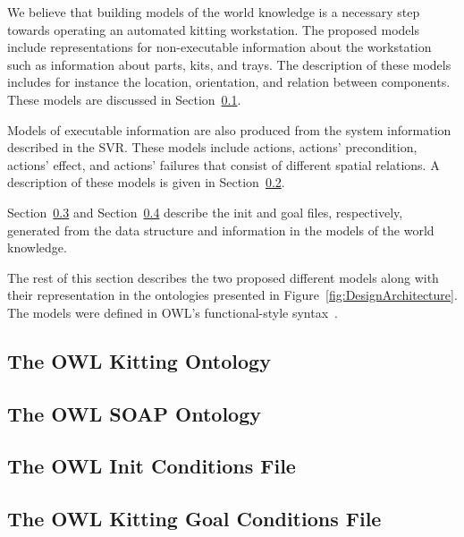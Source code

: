 We believe that building models of the world knowledge is a necessary step towards operating an automated kitting workstation. The proposed models include representations for non-executable information about the workstation such as information about parts, kits, and trays. The description of these models includes for instance the location, orientation, and relation between components. These models are discussed in Section~\ref{owlkitting}.

Models of executable information are also produced from the system information described in the SVR. These models include actions, actions' precondition, actions' effect, and actions' failures that consist of different spatial relations. A description of these models is given in Section~\ref{owlsoap}.

Section~\ref{owlinit} and Section~\ref{owlgoal} describe the init and goal files, respectively, generated from the data structure and information in the models of the world knowledge.

The rest of this section describes the two proposed different models along with their representation in the ontologies presented in Figure~\ref{fig:DesignArchitecture}. The models were defined in OWL's functional-style syntax~\cite{OWLspec}.

\subsection{The OWL Kitting Ontology}\label{owlkitting}

\subsection{The OWL SOAP Ontology}\label{owlsoap}

\subsection{The OWL Init Conditions File} \label{owlinit}

\subsection{The OWL Kitting Goal Conditions File}\label{owlgoal}

